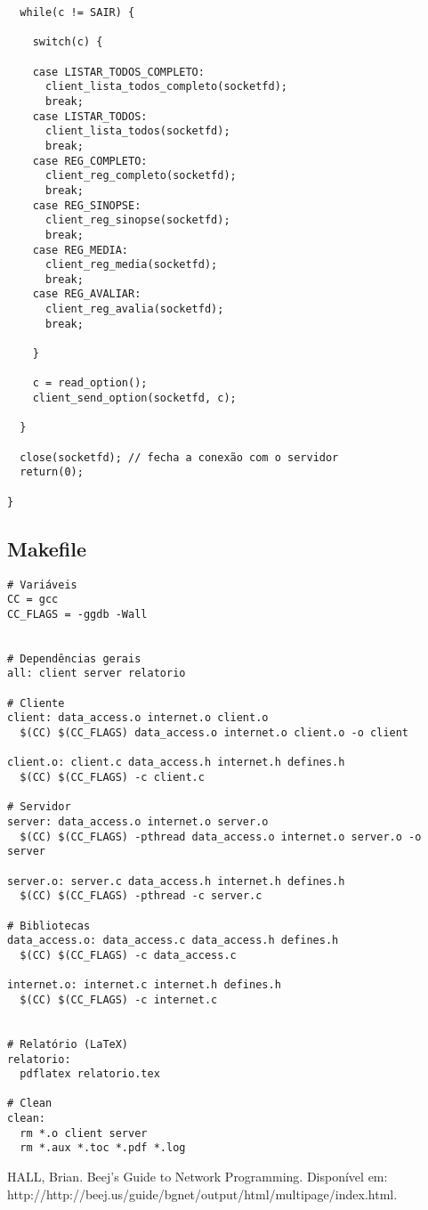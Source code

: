 \documentclass[11pt,twoside]{article}
\begin{document}
\begin{verbatim}
  while(c != SAIR) {
      
    switch(c) {
	
    case LISTAR_TODOS_COMPLETO:
      client_lista_todos_completo(socketfd);
      break;
    case LISTAR_TODOS:
      client_lista_todos(socketfd);
      break;
    case REG_COMPLETO:
      client_reg_completo(socketfd);
      break;
    case REG_SINOPSE:
      client_reg_sinopse(socketfd);
      break;
    case REG_MEDIA:
      client_reg_media(socketfd);
      break;
    case REG_AVALIAR:
      client_reg_avalia(socketfd);
      break;
			
    }
    
    c = read_option();
    client_send_option(socketfd, c);

  }
	
  close(socketfd); // fecha a conexão com o servidor
  return(0);

}
\end{verbatim}


\subsection{Makefile}       %
\begin{verbatim}
# Variáveis
CC = gcc
CC_FLAGS = -ggdb -Wall


# Dependências gerais
all: client server relatorio

# Cliente
client: data_access.o internet.o client.o
  $(CC) $(CC_FLAGS) data_access.o internet.o client.o -o client

client.o: client.c data_access.h internet.h defines.h
  $(CC) $(CC_FLAGS) -c client.c

# Servidor
server: data_access.o internet.o server.o
  $(CC) $(CC_FLAGS) -pthread data_access.o internet.o server.o -o server

server.o: server.c data_access.h internet.h defines.h
  $(CC) $(CC_FLAGS) -pthread -c server.c

# Bibliotecas
data_access.o: data_access.c data_access.h defines.h
  $(CC) $(CC_FLAGS) -c data_access.c

internet.o: internet.c internet.h defines.h
  $(CC) $(CC_FLAGS) -c internet.c


# Relatório (LaTeX)
relatorio:
  pdflatex relatorio.tex

# Clean
clean:
  rm *.o client server
  rm *.aux *.toc *.pdf *.log
\end{verbatim}


\begin{thebibliography}{99}
 HALL, Brian. Beej's Guide to Network Programming. Disponível em: http://http://beej.us/guide/bgnet/output/html/multipage/index.html.
\end{thebibliography}
\end{document}
